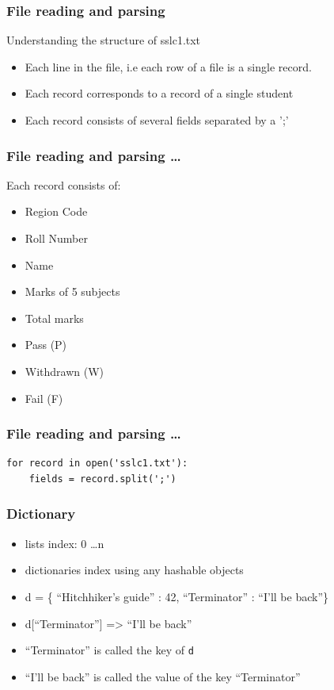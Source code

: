 \documentclass[14pt,compress]{beamer}
\newcommand{\typ}[1]{\lstinline{#1}}
\begin{document}
\begin{frame}
  \frametitle{File reading and parsing}
  Understanding the structure of sslc1.txt
  \begin{itemize}
    \item Each line in the file, i.e each row of a file is a single record.
    \item Each record corresponds to a record of a single student
    \item Each record consists of several fields separated by a ';'
  \end{itemize}
\end{frame}

\begin{frame}
  \frametitle{File reading and parsing \ldots}
  Each record consists of:
  \begin{itemize}
    \item Region Code
    \item Roll Number
    \item Name
    \item Marks of 5 subjects
    \item Total marks
    \item Pass (P)
    \item Withdrawn (W)
    \item Fail (F)
  \end{itemize}
\end{frame}

\begin{frame}[fragile]
  \frametitle{File reading and parsing \ldots}
  \begin{lstlisting}
for record in open('sslc1.txt'):
    fields = record.split(';')
  \end{lstlisting}
\end{frame}

\begin{frame}[fragile]
  \frametitle{Dictionary}
  \begin{itemize}
    \item lists index: 0 \ldots n
    \item dictionaries index using any hashable objects
    \item d = \{ ``Hitchhiker's guide'' : 42, ``Terminator'' : ``I'll be back''\}
    \item d[``Terminator''] => ``I'll be back''
    \item ``Terminator'' is called the key of \typ{d}
    \item ``I'll be back'' is called the value of the key ``Terminator''
  \end{itemize}
\end{frame}
\end{document}
